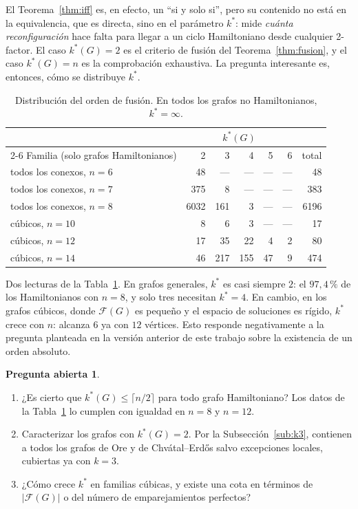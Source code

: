 \documentclass[11pt,a4paper]{article}
\theoremstyle{definition}
\newtheorem{pregunta}[teorema]{Pregunta abierta}
\theoremstyle{remark}
\begin{document}
El Teorema~\ref{thm:iff} es, en efecto, un ``si y solo si'', pero su contenido no está en la equivalencia, que es directa, sino en el parámetro $k^*$: mide \emph{cuánta reconfiguración} hace falta para llegar a un ciclo Hamiltoniano desde cualquier 2-factor. El caso $k^*(G)=2$ es el criterio de fusión del Teorema~\ref{thm:fusion}, y el caso $k^*(G)=n$ es la comprobación exhaustiva. La pregunta interesante es, entonces, cómo se distribuye $k^*$.

\begin{table}[h]
\centering
\begin{tabular}{lrrrrrr}
\toprule
& \multicolumn{5}{c}{$k^*(G)$}\\
\cmidrule(lr){2-6}
Familia (solo grafos Hamiltonianos) & 2 & 3 & 4 & 5 & 6 & total\\
\midrule
todos los conexos, $n=6$ & 48 & --- & --- & --- & --- & 48\\
todos los conexos, $n=7$ & 375 & 8 & --- & --- & --- & 383\\
todos los conexos, $n=8$ & 6032 & 161 & 3 & --- & --- & 6196\\
\midrule
cúbicos, $n=10$ & 8 & 6 & 3 & --- & --- & 17\\
cúbicos, $n=12$ & 17 & 35 & 22 & 4 & 2 & 80\\
cúbicos, $n=14$ & 46 & 217 & 155 & 47 & 9 & 474\\
\bottomrule
\end{tabular}
\caption{Distribución del orden de fusión. En todos los grafos no Hamiltonianos, $k^*=\infty$.}\label{tab:kstar}
\end{table}

Dos lecturas de la Tabla~\ref{tab:kstar}. En grafos generales, $k^*$ es casi siempre $2$: el $97{,}4\,\%$ de los Hamiltonianos con $n=8$, y solo tres necesitan $k^*=4$. En cambio, en los grafos cúbicos, donde $\mathcal{F}(G)$ es pequeño y el espacio de soluciones es rígido, $k^*$ crece con $n$: alcanza $6$ ya con $12$ vértices. Esto responde negativamente a la pregunta planteada en la versión anterior de este trabajo sobre la existencia de un orden absoluto.

\begin{pregunta}\label{q:kstar}
\begin{enumerate}[label=(\alph*)]
\item ¿Es cierto que $k^*(G)\le\lceil n/2\rceil$ para todo grafo Hamiltoniano? Los datos de la Tabla~\ref{tab:kstar} lo cumplen con igualdad en $n=8$ y $n=12$.
\item Caracterizar los grafos con $k^*(G)=2$. Por la Subsección~\ref{sub:k3}, contienen a todos los grafos de Ore y de Chvátal--Erdős salvo excepciones locales, cubiertas ya con $k=3$.
\item ¿Cómo crece $k^*$ en familias cúbicas, y existe una cota en términos de $|\mathcal{F}(G)|$ o del número de emparejamientos perfectos?
\end{enumerate}
\end{pregunta}
\end{document}
